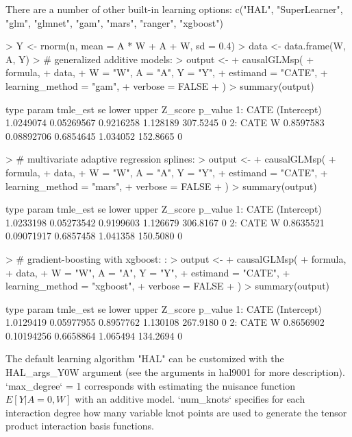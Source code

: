 \documentclass{article}
\begin{document}
There are a number of other built-in learning options: c("HAL", "SuperLearner", "glm", "glmnet", "gam", "mars", "ranger", "xgboost")

\begin{Schunk}
\begin{Sinput}
> Y <- rnorm(n, mean = A * W + A + W, sd = 0.4)
> data <- data.frame(W, A, Y)
> # generalized additive models:
> output <-
+   causalGLMsp(
+     formula,
+     data,
+     W = "W", A = "A", Y = "Y",
+     estimand = "CATE",
+     learning_method = "gam",
+     verbose = FALSE
+   )
> summary(output)
\end{Sinput}
\begin{Soutput}
   type       param  tmle_est         se     lower    upper  Z_score p_value
1: CATE (Intercept) 1.0249074 0.05269567 0.9216258 1.128189 307.5245       0
2: CATE           W 0.8597583 0.08892706 0.6854645 1.034052 152.8665       0
\end{Soutput}
\begin{Sinput}
> # multivariate adaptive regression splines:
> output <-
+   causalGLMsp(
+     formula,
+     data,
+     W = "W", A = "A", Y = "Y",
+     estimand = "CATE",
+     learning_method = "mars",
+     verbose = FALSE
+   )
> summary(output)
\end{Sinput}
\begin{Soutput}
   type       param  tmle_est         se     lower    upper  Z_score p_value
1: CATE (Intercept) 1.0233198 0.05273542 0.9199603 1.126679 306.8167       0
2: CATE           W 0.8635521 0.09071917 0.6857458 1.041358 150.5080       0
\end{Soutput}
\begin{Sinput}
> # gradient-boosting with xgboost: :
> output <-
+   causalGLMsp(
+     formula,
+     data,
+     W = "W", A = "A", Y = "Y",
+     estimand = "CATE",
+     learning_method = "xgboost",
+     verbose = FALSE
+   )
> summary(output) 
\end{Sinput}
\begin{Soutput}
   type       param  tmle_est         se     lower    upper  Z_score p_value
1: CATE (Intercept) 1.0129419 0.05977955 0.8957762 1.130108 267.9180       0
2: CATE           W 0.8656902 0.10194256 0.6658864 1.065494 134.2694       0
\end{Soutput}
\end{Schunk}


The default learning algorithm "HAL" can be customized with the HAL\_args\_Y0W argument (see the arguments in hal9001 for more description). `max\_degree` = 1 corresponds with estimating the nuisance function $E[Y|A=0,W]$ with an additive model. `num\_knots` specifies for each interaction degree how many variable knot points are used to generate the tensor product interaction basis functions. 
\end{document}
